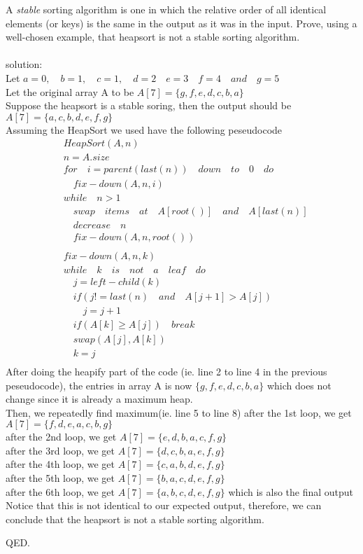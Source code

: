 \documentclass[12pt]{article}
\begin{document}
	A \emph{stable} sorting algorithm is one in which the relative order
	of all identical elements (or keys) is the same in the output as it
	was in the input. Prove, using a well-chosen example, that heapsort is
	not a stable sorting algorithm.
	\\
	\\
	solution:\\
	Let $a=0,\quad b=1,\quad c=1,\quad d=2\quad e=3 \quad f=4 \quad and  \quad g=5$\\
	Let the original array A to be $A[7]=\{g,f,e,d,c,b,a\}$\\
	Suppose the heapsort is a stable soring, then the output should be $A[7]=\{a,c,b,d,e,f,g\}$\\
	Assuming the HeapSort we used have the following peseudocode
	\begin{align}
		&HeapSort(A,n)\\
		&n = A.size\\
		&for \quad i = parent(last(n)) \quad down \quad to \quad 0 \quad do\\
		&\quad fix-down(A,n,i)\\
		&while \quad n > 1\\
		&\quad swap \quad items\quad  at \quad A[root()] \quad and \quad A[last(n)]\\
		&\quad decrease \quad n\\
		&\quad fix-down(A,n,root())\\
		\\
		&fix-down(A,n,k)\\
		&while \quad k \quad is \quad not \quad a \quad leaf \quad do\\
		&\quad j=left-child(k)\\
		&\quad if(j!=last(n)\quad and \quad A[j+1]>A[j])\\
		&\qquad j=j+1\\
		&\quad if(A[k]\geq A[j]) \quad break\\
		&\quad swap(A[j],A[k])\\
		&\quad k=j\\		
	\end{align}
	After doing the heapify part of the code (ie. line 2 to line 4 in the previous peseudocode), the entries in array A is now $\{g,f,e,d,c,b,a\}$ which does not change since it is already a maximum heap.\\
	Then, we repeatedly find maximum(ie. line 5 to line 8)
	after the 1st loop, we get $A[7] = \{f,d,e,a,c,b,g\}$\\
	after the 2nd loop, we get $A[7] = \{e,d,b,a,c,f,g\}$\\
	after the 3rd loop, we get $A[7] = \{d,c,b,a,e,f,g\}$\\
	after the 4th loop, we get $A[7] = \{c,a,b,d,e,f,g\}$\\
	after the 5th loop, we get $A[7] = \{b,a,c,d,e,f,g\}$\\
	after the 6th loop, we get $A[7] = \{a,b,c,d,e,f,g\}$ which is also the final output\\
	Notice that this is not identical to our expected output, therefore, we can conclude that the heapsort is not a stable sorting algorithm.
	
	QED.
	
	
\end{document}
